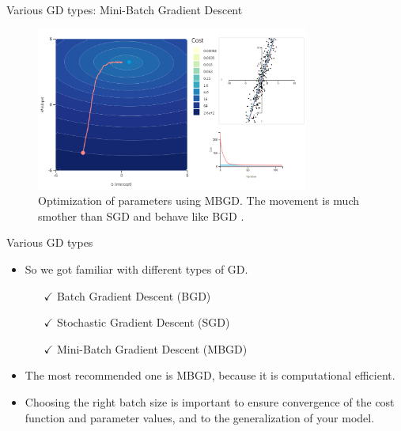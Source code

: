 \begin{frame}{Various GD types: Mini-Batch Gradient Descent}
	\begin{figure}[H]
		\centering
		\includegraphics[width=0.8\textwidth]{Images/mbgd.png}
		\caption{Optimization of parameters using MBGD. The movement is much smother than SGD and behave like BGD \cite{katanforoosh-kunin-opt}.}
	\end{figure} 
\end{frame}

\begin{frame}{Various GD types}
	\begin{itemize}
		\item So we got familiar with different types of GD.
		\begin{itemize}
			\item[\color{darkgreen}$\checkmark$] Batch Gradient Descent (BGD)
			\item[\color{darkgreen}$\checkmark$] Stochastic Gradient Descent (SGD)
			\item[\color{darkgreen}$\checkmark$] Mini-Batch Gradient Descent (MBGD)
		\end{itemize}
		\item[]
		\item[]
		\item The most recommended one is MBGD, because it is computational efficient.
		\item Choosing the right batch size is important to ensure convergence of the cost function and parameter values, and to the generalization of your model.
	\end{itemize}
\end{frame}